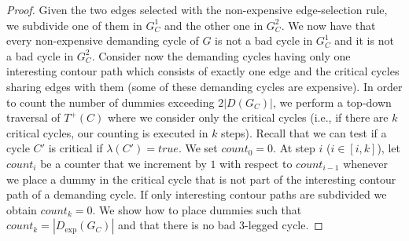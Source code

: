 \documentclass[runningheads]{llncs}
\begin{document}
\begin{proof}
\smallskip
Given the two edges selected with the non-expensive edge-selection rule, we subdivide one of them in $G^1_C$ and the other one in $G^2_C$. We now have that every non-expensive demanding cycle of $G$ is not a bad cycle in $G^1_C$ and it is not a bad cycle in $G^2_C$. Consider now the demanding cycles  having only one interesting contour path which consists of exactly one edge and the critical cycles sharing edges with them (some of these demanding cycles are expensive). In order to count the number of dummies exceeding $2|D(G_C)|$, we perform a top-down traversal of $T^+(C)$ where we consider only the critical cycles (i.e., if there are $k$ critical cycles, our counting is executed in $k$ steps). Recall that we can test if a cycle $C'$ is critical if $\lambda(C')=\mathit{true}$.  We set $count_0=0$. At step $i$ ($i\in [i,k]$), let $count_i$ be a counter that we increment by $1$ with respect to $count_{i-1}$ whenever we place a dummy in the critical cycle that is not part of the interesting contour path of a demanding cycle. If only interesting contour paths are subdivided we obtain $count_k=0$. 
 We show how to place dummies such that $count_k=|D_{\exp}(G_C)|$ and that there is no bad 3-legged cycle. 
 

\end{proof}
\end{document}

